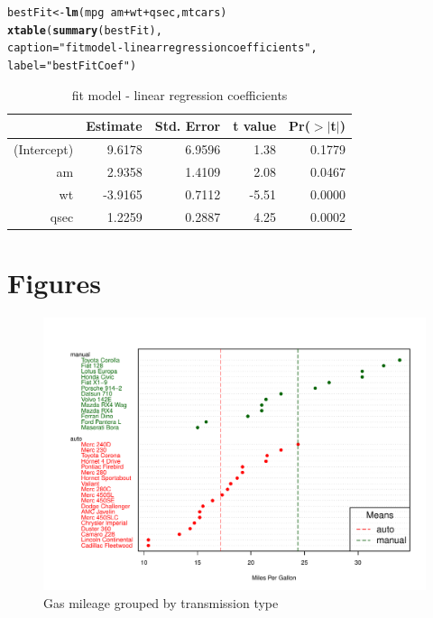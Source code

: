 \documentclass[a4paper, 11pt]{article}\usepackage[]{graphicx}\usepackage[]{color}
\makeatletter
\def\maxwidth{ %
  \ifdim\Gin@nat@width>\linewidth
    \linewidth
  \else
    \Gin@nat@width
  \fi
}
\newcommand{\hlstr}[1]{\textcolor[rgb]{0.192,0.494,0.8}{#1}}%
\newcommand{\hlopt}[1]{\textcolor[rgb]{0,0,0}{#1}}%
\newcommand{\hlstd}[1]{\textcolor[rgb]{0.345,0.345,0.345}{#1}}%
\newcommand{\hlkwb}[1]{\textcolor[rgb]{0.69,0.353,0.396}{#1}}%
\newcommand{\hlkwc}[1]{\textcolor[rgb]{0.333,0.667,0.333}{#1}}%
\newcommand{\hlkwd}[1]{\textcolor[rgb]{0.737,0.353,0.396}{\textbf{#1}}}%
\newenvironment{kframe}{%
 \def\at@end@of@kframe{}%
 \ifinner\ifhmode%
  \def\at@end@of@kframe{\end{minipage}}%
  \begin{minipage}{\columnwidth}%
 \fi\fi%
 \def\FrameCommand##1{\hskip\@totalleftmargin \hskip-\fboxsep
 \colorbox{shadecolor}{##1}\hskip-\fboxsep
     \hskip-\linewidth \hskip-\@totalleftmargin \hskip\columnwidth}%
 \MakeFramed {\advance\hsize-\width
   \@totalleftmargin\z@ \linewidth\hsize
   \@setminipage}}%
 {\par\unskip\endMakeFramed%
 \at@end@of@kframe}
\newenvironment{knitrout}{}{} %
\makeatother
\begin{document}
\begin{kframe}
\begin{alltt}
\hlstd{bestFit} \hlkwb{<-} \hlkwd{lm}\hlstd{(mpg}\hlopt{~}\hlstd{am}\hlopt{+}\hlstd{wt}\hlopt{+}\hlstd{qsec,mtcars)}
\hlkwd{xtable}\hlstd{(}\hlkwd{summary}\hlstd{(bestFit),}
       \hlkwc{caption}\hlstd{=}\hlstr{"fit model - linear regression coefficients"}\hlstd{,}
       \hlkwc{label}\hlstd{=}\hlstr{"bestFitCoef"}\hlstd{)}
\end{alltt}
\end{kframe}%
\begin{table}[ht]
\centering
\begin{tabular}{rrrrr}
  \hline
 & Estimate & Std. Error & t value & Pr($>$$|$t$|$) \\ 
  \hline
(Intercept) & 9.6178 & 6.9596 & 1.38 & 0.1779 \\ 
  am & 2.9358 & 1.4109 & 2.08 & 0.0467 \\ 
  wt & -3.9165 & 0.7112 & -5.51 & 0.0000 \\ 
  qsec & 1.2259 & 0.2887 & 4.25 & 0.0002 \\ 
   \hline
\end{tabular}
\caption{fit model - linear regression coefficients} 
\label{bestFitCoef}
\end{table}


\section{Figures}
\begin{knitrout}
\color{fgcolor}\begin{figure}[!h]

{\centering \includegraphics[width=\maxwidth]{figure/MPGTrans-1} 

}

\caption[Gas mileage grouped by transmission type]{Gas mileage grouped by transmission type}\label{fig:MPGTrans}
\end{figure}


\end{knitrout}
\end{document}
